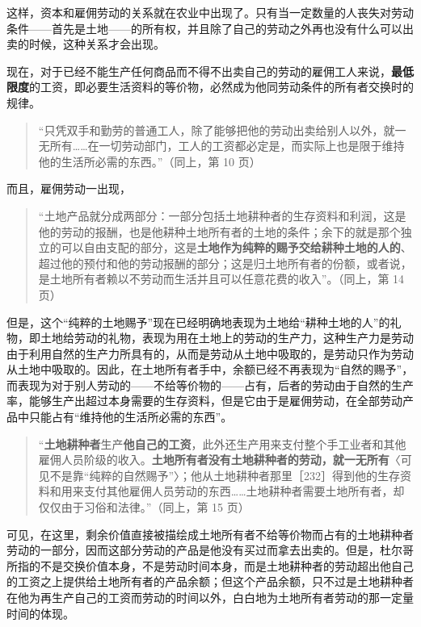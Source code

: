 这样，资本和雇佣劳动的关系就在农业中出现了。只有当一定数量的人丧失对劳动条件——首先是土地——的所有权，并且除了自己的劳动之外再也没有什么可以出卖的时候，这种关系才会出现。

现在，对于已经不能生产任何商品而不得不出卖自己的劳动的雇佣工人来说，\textbf{最低限度}的工资，即必要生活资料的等价物，必然成为他同劳动条件的所有者交换时的规律。

\begin{quote}“只凭双手和勤劳的普通工人，除了能够把他的劳动出卖给别人以外，就一无所有……在一切劳动部门，工人的工资都必定是，而实际上也是限于维持他的生活所必需的东西。”（同上，第 10 页）\end{quote}

而且，雇佣劳动一出现，

\begin{quote}“土地产品就分成两部分：一部分包括土地耕种者的生存资料和利润，这是他的劳动的报酬，也是他耕种土地所有者的土地的条件；余下的就是那个独立的可以自由支配的部分，这是\textbf{土地作为纯粹的赐予交给耕种土地的人的}、超过他的预付和他的劳动报酬的部分；这是归土地所有者的份额，或者说，是土地所有者赖以不劳动而生活并且可以任意花费的收入”。（同上，第 14 页）\end{quote}

但是，这个“纯粹的土地赐予”现在已经明确地表现为土地给“耕种土地的人”的礼物，即土地给劳动的礼物，表现为用在土地上的劳动的生产力，这种生产力是劳动由于利用自然的生产力所具有的，从而是劳动从土地中吸取的，是劳动只作为劳动从土地中吸取的。因此，在土地所有者手中，余额已经不再表现为“自然的赐予”，而表现为对于别人劳动的——不给等价物的——占有，后者的劳动由于自然的生产率，能够生产出超过本身需要的生存资料，但是它由于是雇佣劳动，在全部劳动产品中只能占有“维持他的生活所必需的东西”。

\begin{quote}“\textbf{土地耕种者}生产\textbf{他自己的工资}，此外还生产用来支付整个手工业者和其他雇佣人员阶级的收入。\textbf{土地所有者没有土地耕种者的劳动，就一无所有}〈可见不是靠“纯粹的自然赐予”〉；他从土地耕种者那里［232］得到他的生存资料和用来支付其他雇佣人员劳动的东西……土地耕种者需要土地所有者，却仅仅由于习俗和法律。”（同上，第 15 页）\end{quote}

可见，在这里，剩余价值直接被描绘成土地所有者不给等价物而占有的土地耕种者劳动的一部分，因而这部分劳动的产品是他没有买过而拿去出卖的。但是，杜尔哥所指的不是交换价值本身，不是劳动时间本身，而是土地耕种者的劳动超出他自己的工资之上提供给土地所有者的产品余额；但这个产品余额，只不过是土地耕种者在他为再生产自己的工资而劳动的时间以外，白白地为土地所有者劳动的那一定量时间的体现。

